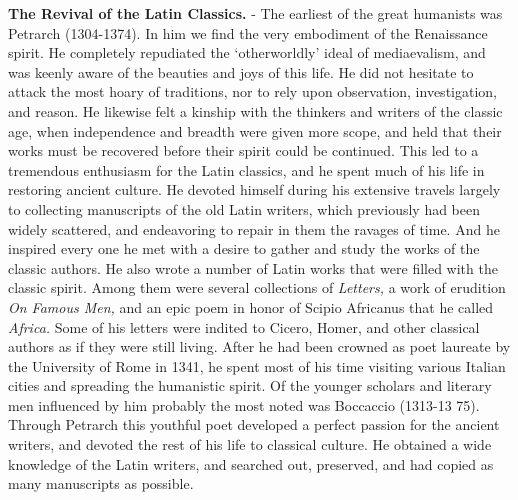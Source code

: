 \documentclass[
]{book}
\begin{document}
\textbf{The Revival of the Latin Classics.} - The earliest of the great humanists was Petrarch (1304-1374). In him we find the very embodiment of the Renaissance spirit. He completely repudiated the `otherworldly' ideal of mediaevalism, and was keenly aware of the beauties and joys of this life. He did not hesitate to attack the most hoary of traditions, nor to rely upon observation, investigation, and reason. He likewise felt a kinship with the thinkers and writers of the classic age, when independence and breadth were given more scope, and held that their works must be recovered before their spirit could be continued. This led to a tremendous enthusiasm for the Latin classics, and he spent much of his life in restoring ancient culture. He devoted himself during his extensive travels largely to collecting manuscripts of the old Latin writers, which previously had been widely scattered, and endeavoring to repair in them the ravages of time. And he inspired every one he met with a desire to gather and study the works of the classic authors. He also wrote a number of Latin works that were filled with the classic spirit. Among them were several collections of \emph{Letters,} a work of erudition \emph{On Famous Men,} and an epic poem in honor of Scipio Africanus that he called \emph{Africa.} Some of his letters were indited to Cicero, Homer, and other classical authors as if they were still living. After he had been crowned as poet laureate by the University of Rome in 1341, he spent most of his time visiting various Italian cities and spreading the humanistic spirit. Of the younger scholars and literary men influenced by him probably the most noted was Boccaccio (1313-13 75). Through Petrarch this youthful poet developed a perfect passion for the ancient writers, and devoted the rest of his life to classical culture. He obtained a wide knowledge of the Latin writers, and searched out, preserved, and had copied as many manuscripts as possible.
\end{document}
